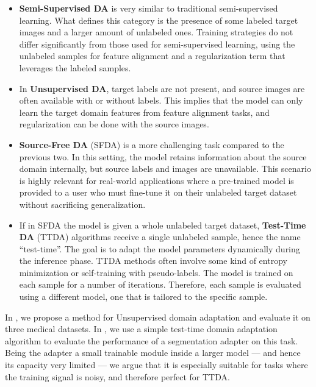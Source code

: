 \begin{itemize}
    \item \textbf{Semi-Supervised DA} is very similar to traditional semi-supervised learning. What defines this category is the presence of some labeled target images and a larger amount of unlabeled ones. Training strategies do not differ significantly from those used for semi-supervised learning, using the unlabeled samples for feature alignment and a regularization term that leverages the labeled samples.
    
    \item In \textbf{Unsupervised DA}, target labels are not present, and source images are often available with or without labels. This implies that the model can only learn the target domain features from feature alignment tasks, and regularization can be done with the source images.
    
    \item \textbf{Source-Free DA} (SFDA) is a more challenging task compared to the previous two. In this setting, the model retains information about the source domain internally, but source labels and images are unavailable. This scenario is highly relevant for real-world applications where a pre-trained model is provided to a user who must fine-tune it on their unlabeled target dataset without sacrificing generalization.
    
    \item If in SFDA the model is given a whole unlabeled target dataset, \textbf{Test-Time DA} (TTDA) algorithms receive a single unlabeled sample, hence the name ``test-time''. The goal is to adapt the model parameters dynamically during the inference phase. TTDA methods often involve some kind of entropy minimization or self-training with pseudo-labels. The model is trained on each sample for a number of iterations. Therefore, each sample is evaluated using a different model, one that is tailored to the specific sample.
\end{itemize}

In , we propose a method for Unsupervised domain adaptation and evaluate it on three medical datasets. In , we use a simple test-time domain adaptation algorithm to evaluate the performance of a segmentation adapter on this task. Being the adapter a small trainable module inside a larger model --- and hence its capacity very limited --- we argue that it is especially suitable for tasks where the training signal is noisy, and therefore perfect for TTDA.
